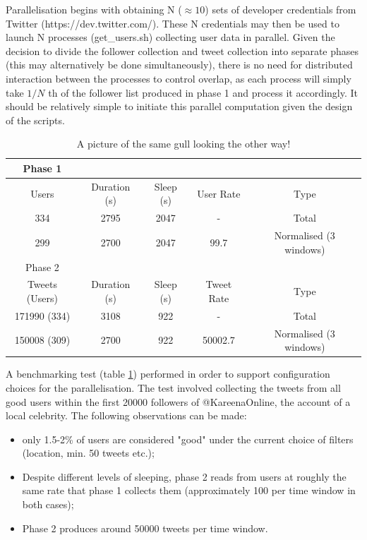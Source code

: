 Parallelisation begins with obtaining N ($\approx 10$) sets of developer credentials from Twitter (https://dev.twitter.com/). These N credentials may then be used to launch N processes (get\_users.sh) collecting user data in parallel. Given the decision to divide the follower collection and tweet collection into separate phases (this may alternatively be done simultaneously), there is no need for distributed interaction between the processes to control overlap, as each process will simply take $1/N$ th of the follower list produced in phase 1 and process it accordingly. It should be relatively simple to initiate this parallel computation given the design of the scripts.

\begin{table}
\begin{center}
\begin{tabular}{ | c | c | c | c | c | }
\hline
Phase 1  \\ \hline
Users & Duration (s) & Sleep (s) & User Rate & Type \\ \hline
334 & 2795 & 2047 & - & Total \\ \hline	    
299 & 2700 & 2047 & 99.7 & Normalised (3 windows) \\ \hline
Phase 2 \\ \hline
Tweets (Users) & Duration (s) & Sleep (s) & Tweet Rate & Type \\ \hline
171990 (334) & 3108 & 922 & - & Total \\ \hline
150008 (309) & 2700 & 922 & 50002.7 &  Normalised (3 windows) \\ \hline
\end{tabular}
\end{center}
\caption{A picture of the same gull looking the other way!}
\label{table:benchmark}
\end{table}

A benchmarking test (table \ref{table:benchmark}) performed in order to support configuration choices for the parallelisation. The test involved collecting the tweets from all good users within the first 20000 followers of @KareenaOnline, the account of a local celebrity. The following observations can be made:

\begin{itemize}
\item only 1.5-2\% of users are considered "good" under the current choice of filters (location, min. 50 tweets etc.);
\item Despite different levels of sleeping, phase 2 reads from users at roughly the same rate that phase 1 collects them (approximately 100 per time window in both cases);
\item Phase 2 produces around 50000 tweets per time window.
\end{itemize}

